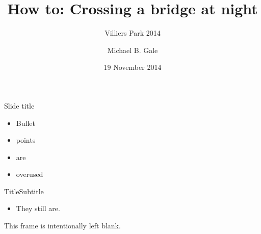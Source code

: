 \documentclass[aspectratio=43]{beamer}
\title{How to: Crossing a bridge at night}
\subtitle{Villiers Park 2014}
\date{19 November 2014}
\author{Michael B. Gale}
\institute{Computer Laboratory, University of Cambridge}
\begin{document}
\begin{frame}
\maketitle
\end{frame}

\begin{frame}{Slide title}
\begin{itemize}
\item Bullet
\item points
\item are
\item overused
\end{itemize}
\end{frame}

\begin{frame}{Title}{Subtitle}
\begin{itemize}
\item They still are.
\end{itemize}
\end{frame}

\begin{frame}
\begin{center}
This frame is intentionally left blank.
\end{center}
\end{frame}
\end{document}
